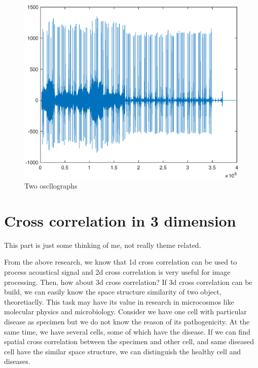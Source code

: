 \begin{figure}[h!]
	\centering
		\includegraphics[width=1\linewidth]{figures/part1/crr_vis3.eps}
	\caption{Two oscllographs}
	\label{fig:crr_vis3}
\end{figure} 

\section{Cross correlation in 3 dimension}

This part is just some thinking of me, not really theme related. 

From the above research, we know that 1d cross correlation can be used to process acoustical signal and 2d cross correlation is very useful for image processing. Then, how about 3d cross correlation? If 3d cross correlation can be build, we can easily know the space structure similarity of two object, theoretiaclly. This task may have its value in research in microcosmos like molecular physics and microbiology. Consider we have one cell with particular disease as specimen but we do not know the reason of its pathogenicity. At the same time, we have several cells, some of which have the disease. If we can find spatial cross correlation between the specimen and other cell, and same diseased cell have the similar space structure, we can distinguish the healthy cell and diseases.